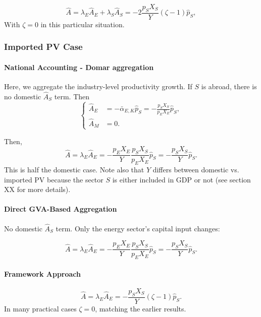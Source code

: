 \documentclass[11pt]{article}
\begin{document}
\begin{equation*}
    \hat{A}=\lambda_E\hat{A}_E+\lambda_S\hat{A}_S=
-2\frac{p_SX_S}{Y}(\zeta-1)\hat{p}_S,
\end{equation*}
With $\zeta=0$ in this particular situation. 



\subsubsection{Imported PV Case}

\paragraph{National Accounting - Domar aggregation} Here, we aggregate the industry-level productivity growth. If $S$ is abroad, there is no domestic $\hat{A}_S$ term. Then
\begin{equation*}
    \begin{cases}
\hat{A}_E&=-\bar{\alpha}_{E,K}\hat{p}_S=-\frac{p_SX_S}{p_EX_E}\hat{p}_S,\\
\hat{A}_M&=0.
\end{cases}
\end{equation*}

Then,
\[
\hat{A}=\lambda_E\hat{A}_E=-\frac{p_EX_E}{Y}\frac{p_SX_S}{p_EX_E}\hat{p}_S=-\frac{p_SX_S}{Y}\hat{p}_S.
\]
This is half the domestic case. Note also that $Y$ differs between domestic vs. imported PV because the sector $S$ is either included in GDP or not (see section XX for more details).

\paragraph{Direct GVA-Based Aggregation}
No domestic $\hat{A}_S$ term. Only the energy sector's capital input changes:

\begin{equation}
    \hat{A} = \lambda_E\hat{A}_E=-\frac{p_EX_E}{Y}\frac{p_SX_S}{p_EX_E}\hat{p}_S=-\frac{p_SX_S}{Y} \hat{p}_{S}.
\end{equation}

\paragraph{Framework Approach}
\begin{equation*}
    \hat{A}=\lambda_E\hat{A}_E=-\frac{p_SX_S}{Y}(\zeta-1)\hat{p}_S.
\end{equation*}
In many practical cases $\zeta=0$, matching the earlier results.
\end{document}
